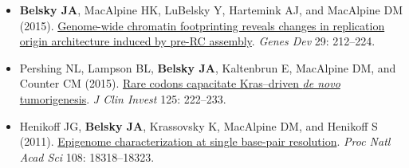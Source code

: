 
\vspace{-2mm}
\begin{resentries}

\begin{itemize}[leftmargin=!, labelindent=5pt, itemindent=-15pt, itemsep=-1.5mm]
	\item{\textbf{Belsky JA}, MacAlpine HK, LuBelsky Y, Hartemink AJ, and MacAlpine DM (2015).  \href{http://dx.doi.org/10.1101/gad.247924.114}{\color{blue} Genome-wide chromatin footprinting reveals changes in replication origin architecture induced by pre-RC assembly}.  \textit{Genes Dev} 29: 212--224.}
	\item{Pershing NL, Lampson BL, \textbf{Belsky JA}, Kaltenbrun E, MacAlpine DM, and Counter CM (2015).  \href{http://dx.doi.org/10.1172/JCI77627}{\color{blue} Rare codons capacitate Kras--driven \textit{de novo} tumorigenesis}.  \textit{J Clin Invest} 125: 222--233.}
	\item{Henikoff JG, \textbf{Belsky JA}, Krassovsky K, MacAlpine DM, and Henikoff S (2011).  \href{http://dx.doi.org/10.1073/pnas.1110731108}{\color{blue} Epigenome characterization at single base-pair resolution}.  \textit{Proc Natl Acad Sci} 108: 18318--18323.}

\end{itemize}

\end{resentries}
